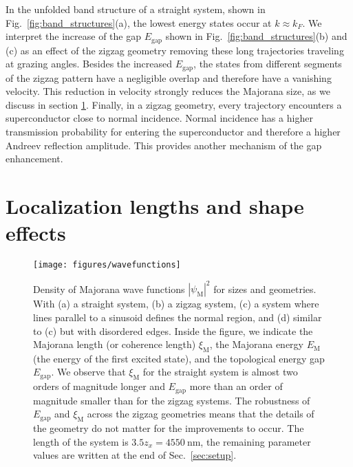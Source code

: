 \documentclass[english, twocolumn, 10pt, aps, superscriptaddress, floatfix, prb, citeautoscript]{revtex4-1}
\renewcommand{\comment}[2]{#2}
\begin{document}
\comment{Zigzag improves the gap and size because of cutting of trajectories and increasing transparency.}
In the unfolded band structure of a straight system, shown in Fig.~\ref{fig:band_structures}(a), the lowest energy states occur at $k \approx k_F$.
We interpret the increase of the gap $E_\textrm{gap}$ shown in Fig.~\ref{fig:band_structures}(b) and (c) as an effect of the zigzag geometry removing these long trajectories traveling at grazing angles.
Besides the increased $E_\textrm{gap}$, the states from different segments of the zigzag pattern have a negligible overlap and therefore have a vanishing velocity.
This reduction in velocity strongly reduces the Majorana size, as we discuss in section \ref{sec:shape_effects}.
Finally, in a zigzag geometry, every trajectory encounters a superconductor close to normal incidence.
Normal incidence has a higher transmission probability for entering the superconductor and therefore a higher Andreev reflection amplitude.
This provides another mechanism of the gap enhancement.

\section{Localization lengths and shape effects}\label{sec:shape_effects}

\begin{figure}[!htb]
\texttt{[image: figures/wavefunctions]}
\caption{Density of Majorana wave functions $\left| \psi_\textrm{M} \right|^2$ for sizes and geometries.
With (a) a straight system, (b) a zigzag system, (c) a system where lines parallel to a sinusoid defines the normal region, and (d) similar to (c) but with disordered edges.
Inside the figure, we indicate the Majorana length (or coherence length) $\xi_\textrm{M}$, the Majorana energy $E_\textrm{M}$ (the energy of the first excited state), and the topological energy gap $E_\textrm{gap}$.
We observe that $\xi_\textrm{M}$ for the straight system is almost two orders of magnitude longer and $E_\textrm{gap}$ more than an order of magnitude smaller than for the zigzag systems.
The robustness of $E_\textrm{gap}$ and $\xi_\textrm{M}$ across the zigzag geometries means that the details of the geometry do not matter for the improvements to occur.
The length of the system is $3.5 z_x=\SI{4550}{\nm}$, the remaining parameter values are written at the end of Sec.~\ref{sec:setup}.\label{fig:wave_functions}}
\end{figure}
\end{document}
